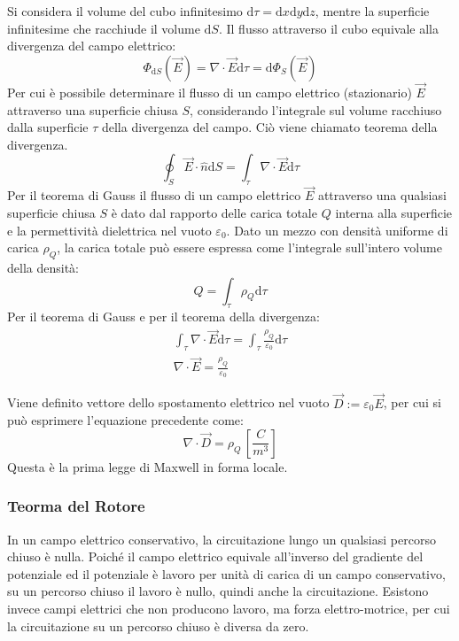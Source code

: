 \documentclass{article}
\newcommand{\df}{\mathrm{d}}
\numberwithin{equation}{subsection}
\begin{document}
Si considera il volume del cubo infinitesimo $\df\tau=\df x\df y\df z$, mentre la superficie infinitesime che racchiude il volume $\df S$. Il flusso attraverso il cubo equivale alla 
divergenza del campo elettrico: 
\begin{equation*}
    \Phi_{\df S}(\vec{E})={\nabla}\cdot\vec{E}\df\tau=\df\Phi_S(\vec{E})
\end{equation*}
Per cui è possibile determinare il flusso di un campo elettrico (stazionario) $\vec{E}$ attraverso una superficie chiusa $S$, considerando l'integrale sul volume 
racchiuso dalla superficie $\tau$ della divergenza del campo. Ciò viene chiamato teorema della divergenza. 
\begin{equation}
    \displaystyle\oint_S\vec{E}\cdot\hat{n}\df S=\int_{\tau}{\nabla}\cdot\vec{E}\df\tau
\end{equation} 
Per il teorema di Gauss il flusso di un campo elettrico $\vec{E}$ attraverso una qualsiasi superficie chiusa $S$ è dato dal rapporto delle carica totale $Q$ interna alla superficie 
e la permettività dielettrica nel vuoto $\varepsilon_0$. Dato un mezzo con densità uniforme di carica $\rho_Q$, la carica totale può essere espressa come l'integrale sull'intero 
volume della densità: 
\begin{equation*}
    Q=\displaystyle\int_{\tau}\rho_Q\df\tau
\end{equation*}  
Per il teorema di Gauss e per il teorema della divergenza:
\begin{gather*}
    \displaystyle\int_{\tau}{\nabla}\cdot \vec{E}\df\tau=\int_{\tau}\frac{\rho_Q}{\varepsilon_0}\df\tau\\
    {\nabla}\cdot\vec{E}=\displaystyle\frac{\rho_Q}{\varepsilon_0}
\end{gather*}

Viene definito vettore dello spostamento elettrico nel vuoto $\vec{D}:=\varepsilon_0\vec{E}$, per cui si può esprimere l'equazione precedente come:
\begin{equation}
    {\nabla}\cdot\vec{D}=\rho_Q\,\displaystyle\left[\frac{C}{m^3}\right]
\end{equation}
Questa è la prima legge di Maxwell in forma locale. 

\subsubsection{Teorma del Rotore}

In un campo elettrico conservativo, la circuitazione lungo un qualsiasi percorso chiuso è nulla. Poiché il campo elettrico equivale all'inverso del gradiente del 
potenziale ed il potenziale è lavoro per unità di carica di un campo conservativo, su un percorso chiuso il lavoro è nullo, quindi anche la circuitazione. Esistono invece 
campi elettrici che non producono lavoro, ma forza elettro-motrice, per cui la circuitazione su un percorso chiuso è diversa da zero. 
\end{document}
